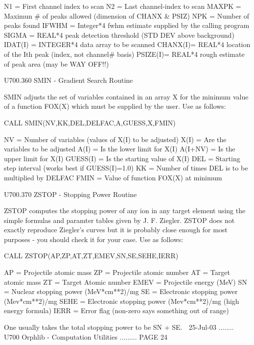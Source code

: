    N1      = First channel index to scan
   N2      = Last  channel-index to scan
   MAXPK   = Maximun # of peaks allowed (dimension of CHANX & PSIZ)
   NPK     = Number of peaks found
   IFWHM   = Integer*4 fwhm estimate supplied by the calling program
   SIGMA   = REAL*4 peak detection threshold (STD DEV above background)
   IDAT(I) = INTEGER*4 data array to be scanned
   CHANX(I)= REAL*4 location of the Ith peak (index, not channel# basis)
   PSIZE(I)= REAL*4 rough estimate of peak area (may be WAY OFF!!)
 
 
 
   U700.360  SMIN  -  Gradient Search Routine
 
   SMIN adjusts the set of variables contained in an array X for  the  minimum
   value  of  a  function  FOX(X)  which  must be supplied by the user. Use as
   follows:
 
          CALL SMIN(NV,KK,DEL,DELFAC,A,GUESS,X,FMIN)
 
   NV       = Number of variables (values of X(I) to be adjusted)
   X(I)     = Are the variables to be adjusted
   A(I)     = Is the lower limit for X(I)
   A(I+NV)  = Is the upper limit for X(I)
   GUESS(I) = Is the starting value of X(I)
   DEL      = Starting step interval (works best if GUESS(I)=1.0)
   KK       = Number of times DEL is to be multiplied by DELFAC
   FMIN     = Value of function FOX(X) at minimum
 
 
 
   U700.370  ZSTOP  -  Stopping Power Routine
 
   ZSTOP computes the stopping power of any ion in any  target  element  using
   the  simple formulas and paramter tables given by J. F. Ziegler. ZSTOP does
   not exactly reproduce Ziegler's curves but it is probably close enough  for
   most purposes - you should check it for your case. Use as follows:
 
          CALL ZSTOP(AP,ZP,AT,ZT,EMEV,SN,SE,SEHE,IERR)
 
   AP   = Projectile atomic mass
   ZP   = Projectile atomic number
   AT   = Target     atomic mass
   ZT   = Target     Atomic number
   EMEV = Projectile energy (MeV)
   SN   = Nuclear    stopping power (MeV*cm**2)/mg
   SE   = Electronic stopping power (Mev*cm**2)/mg
   SEHE = Electronic stopping power (Mev*cm**2)/mg (high energy formula)
   IERR = Error flag (non-zero says something out of range)
 
   One usually takes the total stopping power to be SN + SE.
    
   25-Jul-03 ........ U700  Orphlib - Computation Utilities ......... PAGE  24
 
